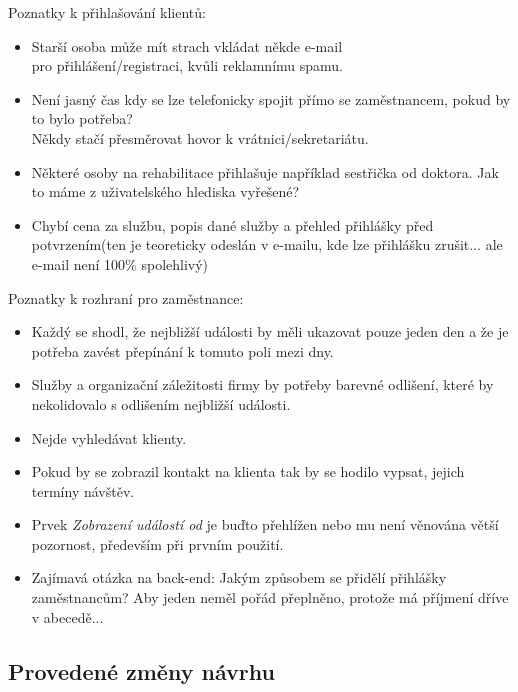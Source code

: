 Poznatky k přihlašování klientů:
\begin{itemize}
    \item Starší osoba může mít strach vkládat někde e-mail\\ pro přihlášení/registraci, kvůli reklamnímu spamu.
    \item Není jasný čas kdy se lze telefonicky spojit přímo se zaměstnancem, pokud by to bylo potřeba?\\ Někdy stačí přesměrovat hovor k vrátnici/sekretariátu.
    \item Některé osoby na rehabilitace přihlašuje například sestřička od doktora. Jak to máme z uživatelského hlediska vyřešené?
    \item Chybí cena za službu, popis dané služby a přehled přihlášky před potvrzením(ten je teoreticky odeslán v e-mailu, kde lze přihlášku zrušit... ale e-mail není 100\% spolehlivý)
\end{itemize}
Poznatky k rozhraní pro zaměstnance:
\begin{itemize}
    \item Každý se shodl, že nejbližší události by měli ukazovat pouze jeden den a že je potřeba zavést přepínání k tomuto poli mezi dny.
    \item Služby a organizační záležitosti firmy by potřeby barevné odlišení, které by nekolidovalo s odlišením nejbližší události.
    \item Nejde vyhledávat klienty.
    \item Pokud by se zobrazil kontakt na klienta tak by se hodilo vypsat, jejich termíny návštěv.
    \item Prvek \emph{Zobrazení událostí od} je buďto přehlížen nebo mu není věnována větší pozornost, především při prvním použití.
    \item Zajímavá otázka na back-end: Jakým způsobem se přidělí přihlášky zaměstnancům? Aby jeden neměl pořád přeplněno, protože má příjmení dříve v abecedě...
\end{itemize}


\subsection*{Provedené změny návrhu}


